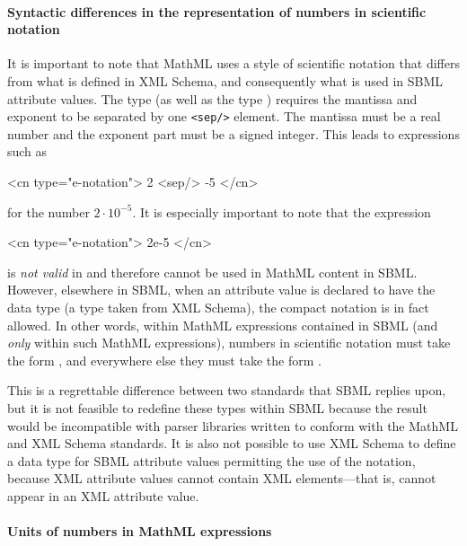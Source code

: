 \paragraph{Syntactic differences in the representation of numbers
  in scientific notation}

It is important to note that MathML uses a style of scientific
notation that differs from what is defined in XML Schema, and
consequently what is used in SBML attribute values.  The
\mathmltwo type 
(as well as the type )
requires the mantissa and
exponent to be separated by one \texttt{<sep/>} element.  The
mantissa must be a real number and the exponent part must be a
signed integer.  This leads to expressions such as

\begin{example}
<cn type="e-notation"> 2 <sep/> -5 </cn>
\end{example}

for the number $2 \cdot 10^{-5}$.  It is especially
important to note that the expression

\begin{example}
<cn type="e-notation"> 2e-5 </cn>
\end{example}

is \emph{not valid} in \mathmltwo and therefore cannot be used in
MathML content in SBML.  However, elsewhere in SBML, when an
attribute value is declared to have the data type
 (a type taken from XML Schema), the compact
notation  is in fact allowed.  In other words, within
MathML expressions contained in SBML (and \emph{only} within such
MathML expressions), numbers in scientific notation must take the
form , and
everywhere else they must take the form .

This is a regrettable difference between two standards that SBML
replies upon, but it is not feasible to redefine these types
within SBML because the result would be incompatible with parser
libraries written to conform with the MathML and XML Schema
standards.  It is also not possible to use XML Schema to define a
data type for SBML attribute values permitting the use of the
 notation, because XML attribute values cannot
contain XML elements---that is,  cannot appear in an
XML attribute value.


\paragraph{Units of numbers in MathML  expressions}
\label{sec:units-of-mathml}

